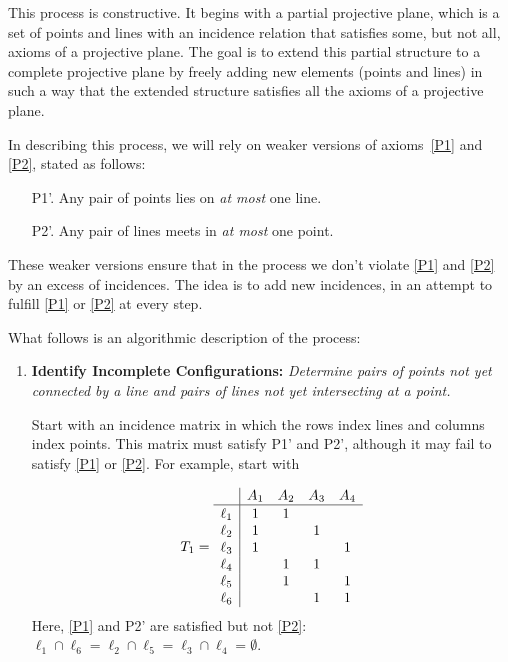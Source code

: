 \begin{xmpl}\label{xmpl:hall-plane} {}
    This process is constructive. It begins with a partial projective plane, which is a set of points and lines with an incidence relation that satisfies some, but not all, axioms of a projective plane. The goal is to extend this partial structure to a complete projective plane by freely adding new elements (points and lines) in such a way that the extended structure satisfies all the axioms of a projective plane.

    In describing this process, we will rely on weaker versions of axioms~\ref{P1} and \ref{P2}, stated as follows:
    \begin{enumerate}
        \item[P1'.] Any pair of points lies on \emph{at most} one line.
        \item[P2'.] Any pair of lines meets in \emph{at most} one point.
    \end{enumerate}
    These weaker versions ensure that in the process we don't violate \ref{P1} and \ref{P2} by an excess of incidences. The idea is to add new incidences, in an attempt to fulfill \ref{P1} or \ref{P2} at every step.

    What follows is an algorithmic description of the process:
    \begin{enumerate}[1.]
        \item \textbf{Identify Incomplete Configurations:} \textit{Determine pairs of points not yet connected by a line and pairs of lines not yet intersecting at a point.}

        Start with an incidence matrix in which the rows index lines and columns index points. This matrix must satisfy P1' and P2', although it may fail to satisfy \ref{P1} or \ref{P2}. For example, start with

        \vspace{-2\parskip}
        \small
        \begin{equation}\label{eq:T1}
            T_1 = \begin{array}{l|cccc}
                &A_1&A_2&A_3&A_4\\
                \hline\rule{0pt}{9pt}
                \ell_1&1&1\\
                \ell_2&1&&1\\
                \ell_3&1&&&1\\
                \ell_4&&1&1\\
                \ell_5&&1&&1\\
                \ell_6&&&1&1
            \end{array}            
        \end{equation}
        \normalsize
        Here, \ref{P1} and P2' are satisfied but not \ref{P2}: $\ell_1\cap\ell_6=\ell_2\cap\ell_5=\ell_3\cap\ell_4=\emptyset$. 


\end{enumerate}
\end{xmpl}
